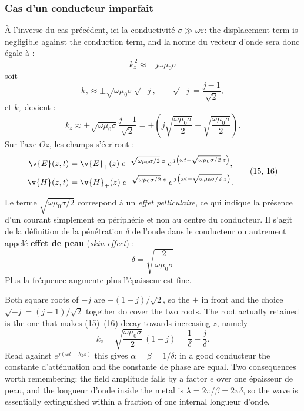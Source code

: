 \subsubsection{Cas d'un conducteur imparfait}

À l'inverse du cas précédent, ici la conductivité $\sigma \gg \omega\varepsilon$:
the displacement term is negligible against the conduction term, and la norme
du vecteur d'onde sera donc égale à :
\[
  k_z^{\,2} \approx -j\omega\mu_0\sigma
  \tag*{(12)}
\]
soit
\[
  k_z \approx \pm\sqrt{\omega\mu_0\sigma}\,\sqrt{-j},
  \qquad \sqrt{-j} = \frac{j-1}{\sqrt{2}} ,
  \tag*{(13)}
\]
et $k_z$ devient :
\[
  k_z \approx \pm\sqrt{\omega\mu_0\sigma}\,\frac{j-1}{\sqrt{2}}
    = \pm\left(j\sqrt{\frac{\omega\mu_0\sigma}{2}} - \sqrt{\frac{\omega\mu_0\sigma}{2}}\right) .
  \tag*{(14)}
\]
Sur l'axe $Oz$, les champs s'écriront :
\[
  \begin{aligned}
    \v{E}(z,t) &= \v{E}_+(z)\;
      e^{-\sqrt{\omega\mu_0\sigma/2}\;z}\;
      e^{\,j\left(\omega t - \sqrt{\omega\mu_0\sigma/2}\;z\right)}, \\[2pt]
    \v{H}(z,t) &= \v{H}_+(z)\;
      e^{-\sqrt{\omega\mu_0\sigma/2}\;z}\;
      e^{\,j\left(\omega t - \sqrt{\omega\mu_0\sigma/2}\;z\right)} .
  \end{aligned}
  \tag*{(15, 16)}
\]

\begin{definition}
  Le terme $\sqrt{\omega\mu_0\sigma/2}$ correspond à un \emph{effet
  pelliculaire}, ce qui indique la présence d'un courant simplement en
  périphérie et non au centre du conducteur. Il s'agit de la définition de la
  pénétration $\delta$ de l'onde dans le conducteur ou autrement appelé
  \textbf{effet de peau} (\textit{skin effect}) :
  \[
    \boxed{\;\delta = \sqrt{\frac{2}{\omega\mu_0\sigma}}\;}
  \]
  Plus la fréquence augmente plus l'épaisseur est fine.
\end{definition}

\begin{remark}
  Both square roots of $-j$ are $\pm(1-j)/\sqrt{2}$, so the $\pm$ in front and
  the choice $\sqrt{-j} = (j-1)/\sqrt{2}$ together do cover the two roots. The
  root actually retained is the one that makes
  (15)--(16) decay towards increasing $z$, namely
  \[
    k_z = \sqrt{\frac{\omega\mu_0\sigma}{2}}\,(1 - j)
        = \frac{1}{\delta} - \frac{j}{\delta} .
  \]
  Read against $e^{j(\omega t - k_z z)}$ this gives $\alpha = \beta = 1/\delta$:
  in a good conducteur the constante d'atténuation and the constante de phase
  are equal. Two consequences worth remembering: the field amplitude falls by a
  factor $e$ over one épaisseur de peau, and the longueur d'onde inside the
  metal is $\lambda = 2\pi/\beta = 2\pi\delta$, so the wave is essentially
  extinguished within a fraction of one internal longueur d'onde.
\end{remark}

